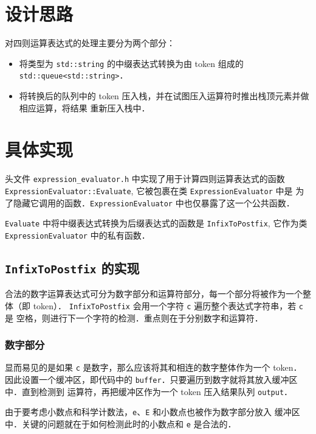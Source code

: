\documentclass[UTF8, 12pt]{ctexart}
\begin{document}
\section{设计思路}
对四则运算表达式的处理主要分为两个部分：
\begin{itemize}
  \item 将类型为 \texttt{std::string} 的中缀表达式转换为由 token 组成的 
  \texttt{std::queue<std::string>}．
  \item 将转换后的队列中的 token 压入栈，并在试图压入运算符时推出栈顶元素并做相应运算，将结果
  重新压入栈中．
\end{itemize}
\section{具体实现}
头文件 \texttt{expression\_evaluator.h} 中实现了用于计算四则运算表达式的函数\newline
\texttt{ExpressionEvaluator::Evaluate}, 它被包裹在类 \texttt{ExpressionEvaluator} 中是
为了隐藏它调用的函数．\texttt{ExpressionEvaluator} 中也仅暴露了这一个公共函数．

\texttt{Evaluate} 中将中缀表达式转换为后缀表达式的函数是 \texttt{InfixToPostfix}, 
它作为类\newline \texttt{ExpressionEvaluator} 中的私有函数．
\subsection{\texttt{InfixToPostfix} 的实现}
合法的数字运算表达式可分为数字部分和运算符部分，每一个部分将被作为一个整体（即 token）．
\texttt{InfixToPostfix} 会用一个字符 \texttt{c} 遍历整个表达式字符串，若 \texttt{c} 是
空格，则进行下一个字符的检测．重点则在于分别数字和运算符．
\subsubsection{数字部分}
显而易见的是如果 \texttt{c} 是数字，那么应该将其和相连的数字整体作为一个 token．
因此设置一个缓冲区，即代码中的 \texttt{buffer}．只要遍历到数字就将其放入缓冲区中．直到检测到
运算符，再把缓冲区作为一个 token 压入结果队列 \texttt{output}．

由于要考虑小数点和科学计数法，\texttt{e}、\texttt{E} 和小数点也被作为数字部分放入
缓冲区中．关键的问题就在于如何检测此时的小数点和 \texttt{e} 是合法的．
\end{document}
